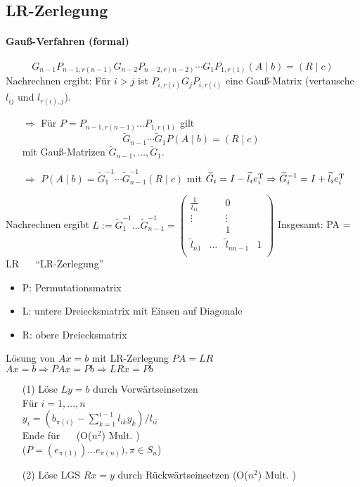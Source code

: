 \subsection{LR-Zerlegung}

\paragraph{Gauß-Verfahren (formal)}
$$G_{n-1} P_{n-1,r(n-1)}G_{n-2}P_{n-2,r(n-2)} \cdots G_1P_{1,r(1)}(A \mid b) = (R \mid c)$$
Nachrechnen ergibt: Für $i>j$ ist $P_{i,r(i)} G_jP_{i,r(i)}$ eine Gauß-Matrix
(vertausche $l_{ij}$ und $l_{r(i),j}$).

\begin{itemize}
\item[$\Rightarrow$] Für $P = P_{n-1,r(n-1)} \dots P_{1,r(1)}$ gilt
    $$\widetilde{G}_{n-1} \cdots \widetilde{G}_1 P (A \mid b) = (R \mid c)$$
    mit Gauß-Matrizen $\widetilde{G}_{n-1}, \dots, \widetilde{G}_1$.

\item[$\Rightarrow$] $P (A \mid b) =
    \widetilde{G}_1^{-1} \cdots \widetilde{G}_{n-1}^{-1} (R \mid c)$
    mit $\widetilde{G}_i = I - \widetilde{l_i} e_i^\mathrm T
         \Rightarrow \widetilde{G}_i^{-1} = I + \widetilde{l_i} e_i^\mathrm T$
\end{itemize}

Nachrechnen ergibt
$L := \widetilde{G}_1^{-1} \dots \widetilde{G}_{n-1}^{-1} =
\begin{pmatrix}
\frac{1}{l_{11}} & & 0 \\
\vdots & & \vdots \\
& & 1 & \\
\widetilde{l}_{n1} & \dots & \widetilde{l}_{nn-1} & 1 \\
\end{pmatrix}$
Insgesamt: PA = LR ~~ "`LR-Zerlegung"'
\begin{itemize}
\item P: Permutationsmatrix
\item L: untere Dreiecksmatrix mit Einsen auf Diagonale
\item R: obere Dreiecksmatrix
\end{itemize}

Lösung von $Ax = b$ mit LR-Zerlegung $PA=LR$ \\
$Ax=b \Rightarrow PAx = Pb \Rightarrow LRx = Pb$
\begin{enumerate}
\item[(1)]
Löse $Ly = b$ durch Vorwärtseinsetzen \\
Für $i = 1, \dots ,n$ \\
$y_i = \left( b_{\pi(i)} - \sum_{k = 1}^{i -1} l_{ik} y_k  \right) / l_{ii}$ \\
Ende für  ~~ (O($n^2$) Mult. )\\
($P = (e_{\pi(1)}) \dots e_{\pi(n)}), \pi \in S_n$)
\item[(2)]
Löse LGS $Rx = y$ durch Rückwärtseinsetzen (O($n^2$) Mult. )
\end{enumerate}

